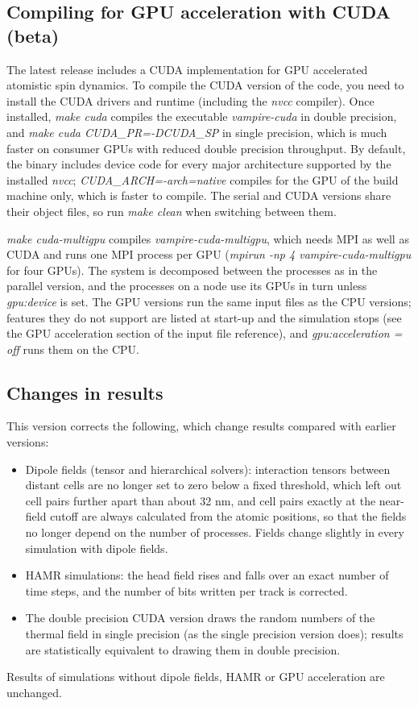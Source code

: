 \subsection*{Compiling for GPU acceleration with CUDA (beta)}
The latest release includes a CUDA implementation for GPU accelerated atomistic spin dynamics. To compile the CUDA version of the code, you need to install the CUDA drivers and runtime (including the \textit{nvcc} compiler). Once installed, \textit{make cuda} compiles the executable \textit{vampire-cuda} in double precision, and \textit{make cuda CUDA\_PR=-DCUDA\_SP} in single precision, which is much faster on consumer GPUs with reduced double precision throughput. By default, the binary includes device code for every major architecture supported by the installed \textit{nvcc}; \textit{CUDA\_ARCH=-arch=native} compiles for the GPU of the build machine only, which is faster to compile. The serial and CUDA versions share their object files, so run \textit{make clean} when switching between them.

\textit{make cuda-multigpu} compiles \textit{vampire-cuda-multigpu}, which needs MPI as well as CUDA and runs one MPI process per GPU (\textit{mpirun -np 4 vampire-cuda-multigpu} for four GPUs). The system is decomposed between the processes as in the parallel version, and the processes on a node use its GPUs in turn unless \textit{gpu:device} is set. The GPU versions run the same input files as the CPU versions; features they do not support are listed at start-up and the simulation stops (see the GPU acceleration section of the input file reference), and \textit{gpu:acceleration = off} runs them on the CPU.

\subsection*{Changes in results}
This version corrects the following, which change results compared with earlier versions:
\begin{itemize}
\item Dipole fields (tensor and hierarchical solvers): interaction tensors between distant cells are no longer set to zero below a fixed threshold, which left out cell pairs further apart than about 32 nm, and cell pairs exactly at the near-field cutoff are always calculated from the atomic positions, so that the fields no longer depend on the number of processes. Fields change slightly in every simulation with dipole fields.
\item HAMR simulations: the head field rises and falls over an exact number of time steps, and the number of bits written per track is corrected.
\item The double precision CUDA version draws the random numbers of the thermal field in single precision (as the single precision version does); results are statistically equivalent to drawing them in double precision.
\end{itemize}
Results of simulations without dipole fields, HAMR or GPU acceleration are unchanged.

